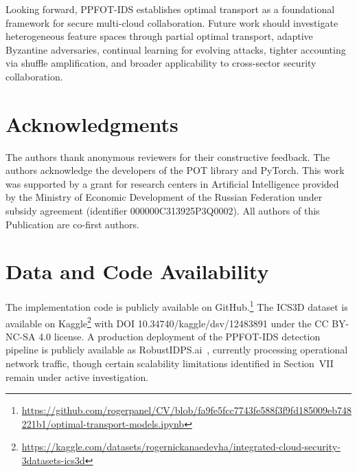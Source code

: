 \documentclass{ieeeaccess}
\theoremstyle{plain}
\theoremstyle{definition}
\theoremstyle{remark}
\begin{document}
Looking forward, PPFOT-IDS establishes optimal transport as a foundational framework for secure multi-cloud collaboration. Future work should investigate heterogeneous feature spaces through partial optimal transport, adaptive Byzantine adversaries, continual learning for evolving attacks, tighter accounting via shuffle amplification, and broader applicability to cross-sector security collaboration.

\section*{Acknowledgments}

The authors thank anonymous reviewers for their constructive feedback. The authors acknowledge the developers of the POT library and PyTorch. This work was supported by a grant for research centers in Artificial Intelligence provided by the Ministry of Economic Development of the Russian Federation under subsidy agreement (identifier 000000C313925P3Q0002). All authors of this Publication are co-first authors. 

\section*{Data and Code Availability}

The implementation code is publicly available on GitHub.\footnote{\url{https://github.com/rogerpanel/CV/blob/fa9fe5fcc7743fe588f3f9fd185009eb748221b1/optimal-transport-models.ipynb}} The ICS3D dataset is available on Kaggle\footnote{\url{https://kaggle.com/datasets/rogernickanaedevha/integrated-cloud-security-3datasets-ics3d}} with DOI 10.34740/kaggle/dsv/12483891 under the CC BY-NC-SA 4.0 license. A production deployment of the PPFOT-IDS detection pipeline is publicly available as RobustIDPS.ai~\cite{robust2026}, currently processing operational network traffic, though certain scalability limitations identified in Section~VII remain under active investigation.
\end{document}
